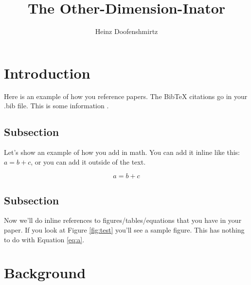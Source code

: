 \documentclass{ndreureport}
\author{Heinz Doofenshmirtz}
\title{The Other-Dimension-Inator}
\begin{document}
\maketitle


\begin{abstract}
    \lipsum[1]
\end{abstract}


\section{Introduction}

\lipsum[3]

Here is an example of how you reference papers. The BibTeX citations go in your .bib file. This is some information \cite{sample}.

\subsection{Subsection}

\lipsum[4]

Let's show an example of how you add in math. You can add it inline like this: $a = b + c$, or you can add it outside of the text.

\begin{equation}
    a = b + c
    \label{eq:a}
\end{equation}

\subsection{Subsection}

\lipsum[3]

Now we'll do inline references to figures/tables/equations that you have in your paper. If you look at Figure \ref{fig:test} you'll see a sample figure. This has nothing to do with Equation \ref{eq:a}.

\section{Background}

\lipsum[5]
\end{document}
